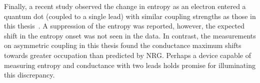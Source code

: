 Finally, a recent study observed the change in entropy as an electron entered a quantum dot (coupled to a single lead) with similar coupling strengths as those in this thesis~\cite{child_strong}. 
A suppression of the entropy was reported, however, the expected shift in the entropy onset was not seen in the data. 
In contrast, the measurements on asymmetric coupling in this thesis found the conductance maximum shifts towards greater occupation than predicted by NRG.
Perhaps a device capable of measuring entropy and conductance with two leads holds promise for illuminating this discrepancy.

